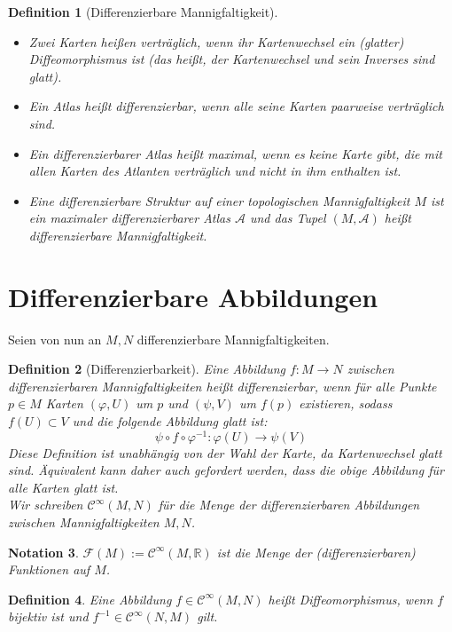 \documentclass[a4paper]{scrreprt}
\numberwithin{equation}{chapter}
\newcommand{\R}{\mathds{R}}
\newcommand{\sC}{\mathcal{C}^{\infty}}
\newcommand{\sm}{\mathcal{F}(M)}
\theoremstyle{plain}
\newtheorem{defn}{Definition}[section]
\newtheorem{nota}[defn]{Notation}
\begin{document}
		\begin{defn}[Differenzierbare Mannigfaltigkeit]\hfill
			\begin{itemize}
				\item Zwei Karten heißen verträglich, wenn ihr Kartenwechsel ein (glatter) Diffeomorphismus ist (das heißt, der Kartenwechsel und sein Inverses sind glatt).
				\item Ein Atlas heißt differenzierbar, wenn alle seine Karten paarweise verträglich sind.
				\item Ein differenzierbarer Atlas heißt maximal, wenn es keine Karte gibt, die mit allen Karten des Atlanten verträglich und nicht in ihm enthalten ist.
				\item Eine differenzierbare Struktur auf einer topologischen Mannigfaltigkeit $M$ ist ein maximaler differenzierbarer Atlas $\mathcal{A}$ und das Tupel $(M,\mathcal{A})$ heißt differenzierbare Mannigfaltigkeit.
			\end{itemize}
		\end{defn}
	\section{Differenzierbare Abbildungen}
		Seien von nun an $M,N$ differenzierbare Mannigfaltigkeiten.
		\begin{defn}[Differenzierbarkeit]
			Eine Abbildung $f:M\rightarrow N$ zwischen differenzierbaren Mannigfaltigkeiten heißt differenzierbar, wenn für alle Punkte $p\in M$ Karten $(\varphi,U)$ um  $p$ und $(\psi,V)$ um $f(p)$ existieren, sodass $f(U)\subset V$ und die folgende Abbildung glatt ist:
			\begin{equation}
				\psi\circ f \circ \varphi^{-1}:\varphi(U)\rightarrow \psi(V)
			\end{equation}
			Diese Definition ist unabhängig von der Wahl der Karte, da Kartenwechsel glatt sind. Äquivalent kann daher auch gefordert werden, dass die obige Abbildung für alle Karten glatt ist.\\
			Wir schreiben $\sC(M,N)$ für die Menge der differenzierbaren Abbildungen zwischen Mannigfaltigkeiten $M,N$.
		\end{defn}
		\begin{nota}
			$\sm:=\sC(M,\R)$ ist die Menge der (differenzierbaren) Funktionen auf $M$.
		\end{nota}
		\begin{defn}
			Eine Abbildung $f\in\sC(M,N)$ heißt Diffeomorphismus, wenn $f$ bijektiv ist und $f^{-1}\in\sC(N,M)$ gilt.
		\end{defn}
\end{document}

